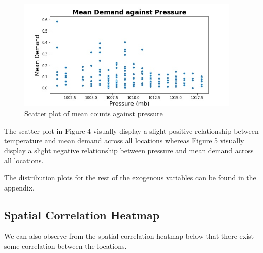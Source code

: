 \documentclass[12pt, letterpaper] {article}
\begin{document}
\begin{figure}[H]
    \centering
    \includegraphics[width=0.95\textwidth, height=0.32\textheight]{Images/pressure_mean_demand.jpg}
    \caption{Scatter plot of mean counts against pressure}
    \label{fig:Scatter plot of mean counts against pressure}
\end{figure}

\noindent The scatter plot in Figure 4 visually display a slight positive relationship between temperature and mean demand across all locations whereas Figure 5 visually display a slight negative relationship between pressure and mean demand across all locations. 

\noindent The distribution plots for the rest of the exogenous variables can be found in the appendix. 

\subsection{Spatial Correlation Heatmap}

We can also observe from the spatial correlation heatmap below that there exist some correlation between the locations. 
\end{document}
